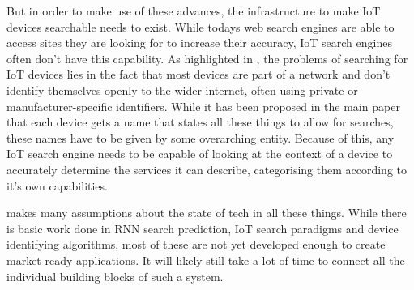 \documentclass [journal]{IEEEtran}
\begin{document}
But in order to make use of these advances, the infrastructure to make IoT devices searchable needs to exist. While todays web search engines are able to access sites they are looking for to increase their accuracy, IoT search engines often don't have this capability. As highlighted in \cite{searchLessons}, the problems of searching for IoT devices lies in the fact that most devices are part of a network and don't identify themselves openly to the wider internet, often using private or manufacturer-specific identifiers. While it has been proposed in the main paper that each device gets a name that states all these things to allow for searches, these names have to be given by some overarching entity. Because of this, any IoT search engine needs to be capable of looking at the context of a device to accurately determine the services it can describe, categorising them according to it's own capabilities. \par
\cite{main} makes many assumptions about the state of tech in all these things. While there is basic work done in RNN search prediction, IoT search paradigms and device identifying algorithms, most of these are not yet developed enough to create market-ready applications. It will likely still take a lot of time to connect all the individual building blocks of such a system.
\end{document}
